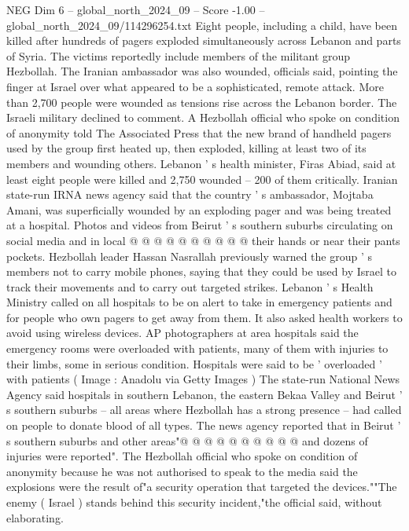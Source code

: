 \begin{textsample}{NEG Dim 6 – global\_north\_2024\_09 – Score -1.00 – global\_north\_2024\_09/114296254.txt}  \label{ex:f6_neg_096}
Eight people, including a child, have been killed after hundreds of pagers exploded simultaneously across Lebanon and parts of Syria.
The victims reportedly include members of the militant group Hezbollah.
The Iranian ambassador was also wounded, officials said, pointing the finger at Israel over what appeared to be a sophisticated, remote attack.
More than 2,700 people were wounded as tensions rise across the Lebanon border.
The Israeli military declined to comment.
A Hezbollah official who spoke on condition of anonymity told The Associated Press that the new brand of handheld pagers used by the group first heated up, then exploded, killing at least two of its members and wounding others.
Lebanon ' s health minister, Firas Abiad, said at least eight people were killed and 2,750 wounded -- 200 of them critically.
Iranian state-run IRNA news agency said that the country ' s ambassador, Mojtaba Amani, was superficially wounded by an exploding pager and was being treated at a hospital.
Photos and videos from Beirut ' s southern suburbs circulating on social media and in local @ @ @ @ @ @ @ @ @ @ their hands or near their pants pockets.
Hezbollah leader Hassan Nasrallah previously warned the group ' s members not to carry mobile phones, saying that they could be used by Israel to track their movements and to carry out targeted strikes.
Lebanon ' s Health Ministry called on all hospitals to be on alert to take in emergency patients and for people who own pagers to get away from them.
It also asked health workers to avoid using wireless devices.
AP photographers at area hospitals said the emergency rooms were overloaded with patients, many of them with injuries to their limbs, some in serious condition.
Hospitals were said to be ' overloaded ' with patients ( Image : Anadolu via Getty Images ) The state-run National News Agency said hospitals in southern Lebanon, the eastern Bekaa Valley and Beirut ' s southern suburbs -- all areas where Hezbollah has a strong presence -- had called on people to donate blood of all types.
The news agency reported that in Beirut ' s southern suburbs and other areas"@ @ @ @ @ @ @ @ @ @ and dozens of injuries were reported".
The Hezbollah official who spoke on condition of anonymity because he was not authorised to speak to the media said the explosions were the result of"a security operation that targeted the devices.""The enemy ( Israel ) stands behind this security incident,"the official said, without elaborating.

\end{textsample}
